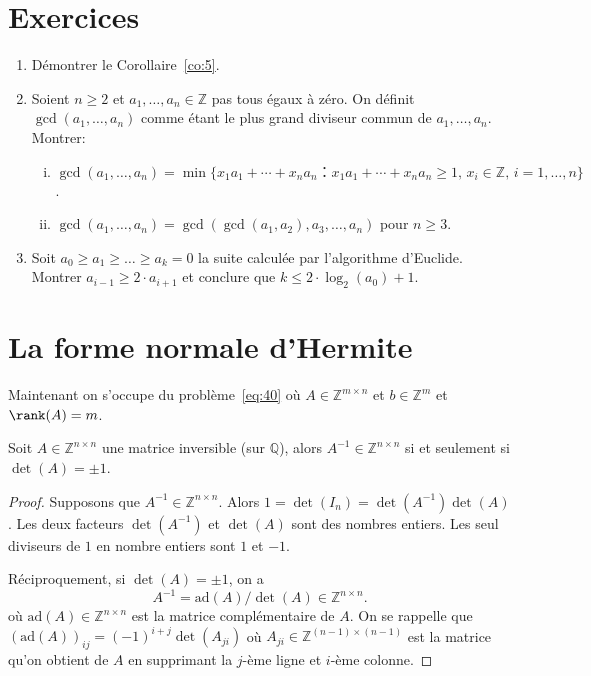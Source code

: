 \section*{Exercices}

\begin{enumerate}
\item Démontrer le Corollaire~\ref{co:5}.
\item Soient $n≥2$ et $a_1,\dots,a_n∈ ℤ$ pas tous égaux à zéro. On définit $\gcd(a_1,\dots,a_n)$ comme étant le plus grand diviseur commun de $a_1,\dots,a_n$. Montrer: 
  \begin{enumerate}[i)]
    \item  $\gcd(a_1,\dots,a_n) =  \min\{x_1a_1+ \cdots + x_n a_n ： x_1a_1+ \cdots + x_n a_n≥1, \, x_i ∈ℤ, \, i=1,\dots,n\}$. 
  \item $\gcd(a_1,\dots,a_n) = \gcd(\gcd(a_1,a_2), a_3, \dots, a_n)$ pour $n≥3$. 
  \end{enumerate}
\item Soit $a_0≥a_1≥\dots≥a_k=0$ la suite calculée par l'algorithme d'Euclide. Montrer $a_{i-1} ≥ 2⋅ a_{i+1}$ et conclure  que $k ≤2 ⋅ \log_2(a_0)+1$.  
\end{enumerate}



\section{La forme normale d'Hermite}
\label{sec:la-forme-normale-1}

Maintenant on s'occupe du problème~\eqref{eq:40} où $A ∈ ℤ^{m ×n}$ et $b ∈ℤ^m$ et $\rank(A) = m$.

\begin{lemma}
  \label{lem:23}
  Soit $A ∈ℤ^{n ×n}$ une matrice inversible (sur $ℚ$), alors $A^{-1} ∈ ℤ^{n ×n}$ si et seulement si $\det(A) = \pm 1$. 
\end{lemma}

\begin{proof}
  Supposons que $A^{-1} ∈ℤ^{n ×n}$. Alors $1 = \det(I_n)  = \det(A^{-1}) \det(A)$. Les deux facteurs $\det(A^{-1})$ et $ \det(A)$ sont des nombres entiers. Les seul diviseurs de $1$ en nombre entiers sont $1$ et $-1$.

  Réciproquement, si $\det(A) = \pm 1$, on a
  \begin{displaymath}
    A^{-1} = \mathrm{ad}(A) / \det(A) ∈ℤ^{n ×n}. 
  \end{displaymath}
  où $\mathrm{ad}(A) ∈ ℤ^{n ×n}$ est la matrice complémentaire de $A$. On se rappelle que $(\mathrm{ad}(A))_{ij} = (-1)^{i+j}\det(A_{ji})$ où $A_{ji}∈ℤ^{(n-1)×(n-1)}$ est la matrice qu'on obtient de $A$ en supprimant la $j$-ème ligne et $i$-ème colonne.
  \end{proof}

